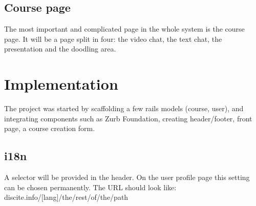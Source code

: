 \subsection{Course page}
The most important and complicated page in the whole system is the course page.
It will be a page split in four: the video chat, the text chat, the presentation
and the doodling area.

\section{Implementation}
The project was started by scaffolding a few rails models (course, user), and
integrating components such as Zurb Foundation, creating header/footer, front
page, a course creation form.

\subsection{i18n}
A selector will be provided in the header. On the user profile page this setting
can be chosen permanently. The URL should look like:
discite.info/[lang]/the/rest/of/the/path
